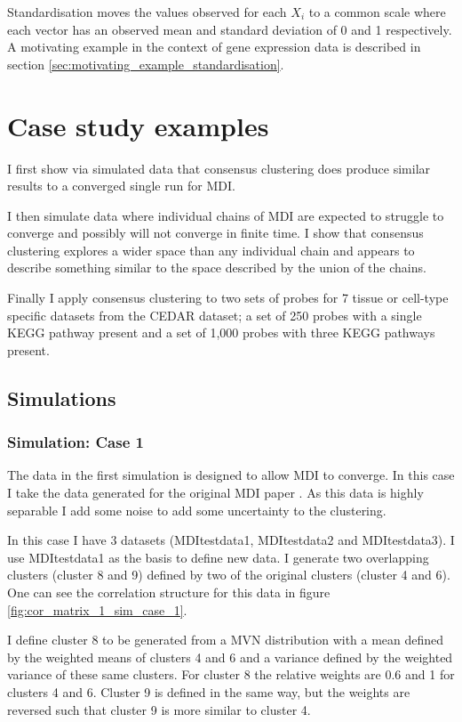 \documentclass[12pt]{article} %
\begin{document}
	Standardisation moves the values observed for each $X_i$ to a common scale where each vector has an observed mean and standard deviation of 0 and 1 respectively. A motivating example in the context of gene expression data is described in section \ref{sec:motivating_example_standardisation}.

	\section{Case study examples}
	I first show via simulated data that consensus clustering does produce similar results to a converged single run for MDI.
	
	I then simulate data where individual chains of MDI are expected to struggle to converge and possibly will not converge in finite time. I show that consensus clustering explores a wider space than any individual chain and appears to describe something similar to the space described by the union of the chains.
	
	Finally I apply consensus clustering to two sets of probes for 7 tissue or cell-type specific datasets from the CEDAR dataset; a set of 250 probes with a single KEGG pathway present and a set of 1,000 probes with three KEGG pathways present.
	
	\subsection{Simulations}
	\subsubsection{Simulation: Case 1} \label{sec:sim:data:case_1}
	The data in the first simulation is designed to allow MDI to converge. In this case I take the data generated for the original MDI paper \citep{KirkBayesiancorrelatedclustering2012}. As this data is highly separable I add some noise to add some uncertainty to the clustering. 
	
	In this case I have 3 datasets (MDItestdata1, MDItestdata2 and MDItestdata3). I use MDItestdata1 as the basis to define new data. I generate two overlapping clusters (cluster 8 and 9) defined by two of the original clusters (cluster 4 and 6). One can see the correlation structure for this data in figure \ref{fig:cor_matrix_1_sim_case_1}.
	
	I define cluster 8 to be generated from a MVN distribution with a mean defined by the weighted means of clusters 4 and 6 and a variance defined by the weighted variance of these same clusters. For cluster 8 the relative weights are 0.6 and 1 for clusters 4 and 6. Cluster 9 is defined in the same way, but the weights are reversed such that cluster 9 is more similar to cluster 4. 
	
\end{document}
